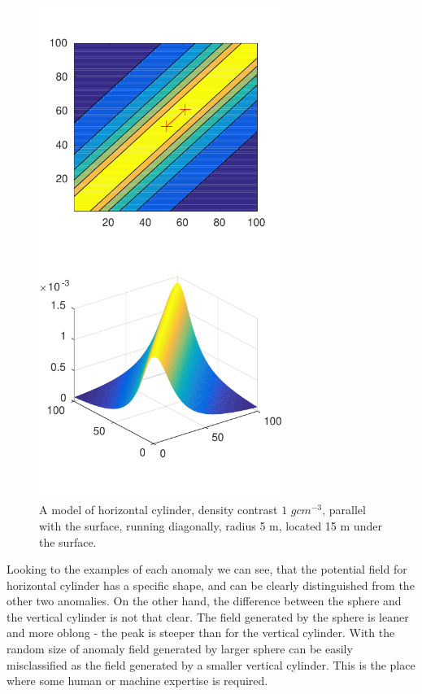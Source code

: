 \documentclass{article}
\begin{document}
\begin{figure}[!htp]
\centerline{\includegraphics[width=8cm]{img/Horizontal_cylinder_50_50_60_60_15_1000000_5_100_1_100_1.pdf}}
\renewcommand{\figurename}{Figure}
\caption[Input data example - Horizontal cylinder]{A model of horizontal cylinder, density contrast $1$ $gcm^{-3}$, parallel with the surface, running diagonally, radius 5 m, located 15 m under the surface.}
\label{fig:HorizontalAnomalyExample}
\end{figure}

Looking to the examples of each anomaly we can see, that the potential
field for horizontal cylinder has a specific shape, and can be clearly
distinguished from the other two anomalies. On the other hand, the
difference between the sphere and the vertical cylinder is not that
clear. The field generated by the sphere is leaner and more oblong - the
peak is steeper than for the vertical cylinder. With the random size of
anomaly field generated by larger sphere can be easily misclassified as
the field generated by a smaller vertical cylinder. This is the place
where some human or machine expertise is required.
\end{document}
